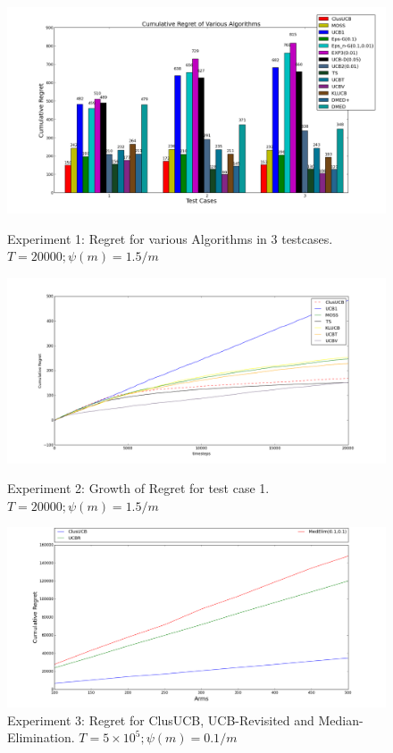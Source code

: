 \begin{figure}[!tbp]
\centering
\begin{minipage}[b]{0.4\textwidth}
\includegraphics[width=\textwidth]{img/cl_final11.png}
\caption{Experiment 1: Regret for various Algorithms in 3 testcases. $T=20000; \psi(m)=1.5/m$}
\end{minipage}
\hspace{0.1em}
\begin{minipage}[b]{0.4\textwidth}
\includegraphics[width=\textwidth]{img/cl_final2.png}
\caption{Experiment 2: Growth of Regret for test case 1. $T=20000; \psi(m)=1.5/m$}
\end{minipage}
\hspace{0.1em}
\begin{minipage}[b]{0.4\textwidth}
\includegraphics[width=\textwidth]{img/cl_final3.png}
\caption{Experiment 3: Regret for ClusUCB, UCB-Revisited and Median-Elimination. $T=5\times10^5; \psi(m)=0.1/m$}
\end{minipage}
\hspace{0.1em}
\end{figure}

